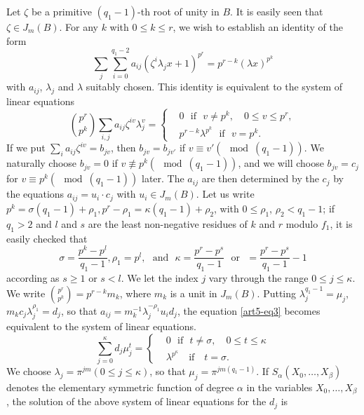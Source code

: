 Let $\zeta$ be a primitive $(q_1-1)$-th root of unity in $B$. It is easily seen that $\zeta \in J_m (B)$. For any $k$ with $0 \leq k \leq r$, we wish to establish an identity of the form 
\begin{equation}
\sum\limits_j \sum\limits^{q_1 -2}_{i=0} a_{ij} (\zeta^i \lambda_j x + 1)^{p^r} = p^{r-k} (\lambda x)^{p^k} \label{art5-eq3}
\end{equation}
with $a_{ij}$, $\lambda_j$ and $\lambda$ suitably chosen. This identity is equivalent to the system of linear equations
\begin{equation*}
\binom{p^r}{p^k} \sum\limits_{i,j} a_{ij} \zeta^{iv} \lambda_j^v  = 
\left\{
\begin{aligned}
& 0 \text{~ if ~} v \neq p^k, \quad 0 \leq v \leq p^r,\\
& p^{r-k} \lambda^{p^k} \text{~ if ~} v = p^k.
\end{aligned}
\right.
\end{equation*}
If we put $\sum\limits_i a_{ij} \zeta^{iv} = b_{jv}$, then $b_{jv} = b_{jv'}$ if $v \equiv v' (\mod (q_1-1))$. We naturally choose $b_{jv}= 0$ if $v \not\equiv p^k (\mod (q_1 -1))$, and we will choose $b_{jv} =c_j$ for $v \equiv p^k (\mod (q_1 -1))$ later. The $a_{ij}$ are then determined by the $c_j$ by the equations $a_{ij} = u_i \cdot c_j$ with $u_i \in J_m (B)$. Let us write $p^k =\sigma (q_1 -1) + \rho_1, p^r - \rho_1 = \kappa (q_1 -1) +\rho_2$, with $0 \leq \rho_1$, $\rho_2 < q_1-1$; if $q_1 > 2$ and $l$ and $s$ are the least non-negative residues of $k$ and $r$ modulo $f_1$, it is easily checked that 
$$
\sigma = \dfrac{p^k - p^l}{q_1 -1}, \rho_1 = p^l, \text{ ~and~ } \kappa =\dfrac{p^r - p^s}{q_1 -1} \text{ ~or~ } = \dfrac{p^r - p^s}{q_1 -1} - 1
$$
according as $s \geq 1$ or $s < l$. We let the index $j$ vary through the range $0 \leq j \leq \kappa$. We write $\binom{p^r}{p^k} = p^{r-k} m_k$, where $m_k$ is a unit in $J_m (B)$. Putting $\lambda_j^{q_1-1} = \mu_j$, $m_k c_j \lambda_j^{\rho_1} = d_j$, so that $a_{ij} = m_k^{-1} \lambda_j^{-\rho_1} u_i d_j$, the equation \eqref{art5-eq3} becomes equivalent to the system of linear equations.
\begin{equation*}
\sum\limits^{\kappa}_{j=0} d_j \mu^t_j = 
\left\{
\begin{aligned}
& 0 \text{~ if ~} t \neq \sigma, \quad 0 \leq t \leq \kappa\\
& \lambda^{p^\kappa} \text{ ~ if ~ } t = \sigma.
\end{aligned}
\right.
\end{equation*}
We choose $\lambda_j = \pi^{jm} (0 \leq j \leq \kappa)$, so that $\mu_j = \pi^{jm(q_1-1)}$. If $S_\alpha (X_0, \ldots, X_\beta)$ denotes the elementary symmetric function of degree $\alpha$ in the variables $X_0,\ldots, X_\beta$, the solution of the above system of linear equations for the $d_j$ is
